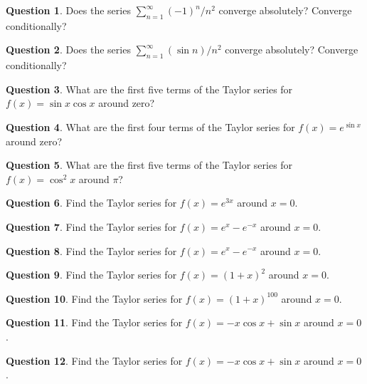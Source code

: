 \documentclass[12pt]{article}
\theoremstyle{definition}
\newtheorem{question}{Question}
\newcommand{\sumn}{\displaystyle\sum_{n=1}^{\infty}}
\begin{document}
\begin{question}
Does the series $\sumn (-1)^n / n^2$ converge absolutely?  Converge conditionally?
\end{question}

\begin{question}
Does the series $\sumn \left(\sin n\right)/ n^2$ converge absolutely?  Converge conditionally?
\end{question}

\begin{question}
What are the first five terms of the Taylor series for
$f(x) = \sin x \cos x$ around zero?
\end{question}

\begin{question}
What are the first four terms of the Taylor series for
$f(x) = e^{\sin x}$ around zero?
\end{question}

\begin{question}
What are the first five terms of the Taylor series for
$f(x) = \cos^2 x$ around $\pi$?
\end{question}

\begin{question}
Find the Taylor series for $f(x) = e^{3x}$ around $x = 0$.
\end{question}

\begin{question}
Find the Taylor series for $f(x) = e^x - e^{-x}$ around $x = 0$.
\end{question}

\begin{question}
Find the Taylor series for $f(x) = e^x - e^{-x}$ around $x = 0$.
\end{question}

\begin{question}
Find the Taylor series for $f(x) = (1 + x)^{2}$ around $x = 0$.
\end{question}

\begin{question}
Find the Taylor series for $f(x) = (1 + x)^{100}$ around $x = 0$.
\end{question}

\begin{question}
Find the Taylor series for $f(x) = - x \cos x + \sin x$ around $x = 0$.
\end{question}

\begin{question}
Find the Taylor series for $f(x) = - x \cos x + \sin x$ around $x = 0$.
\end{question}
\end{document}
